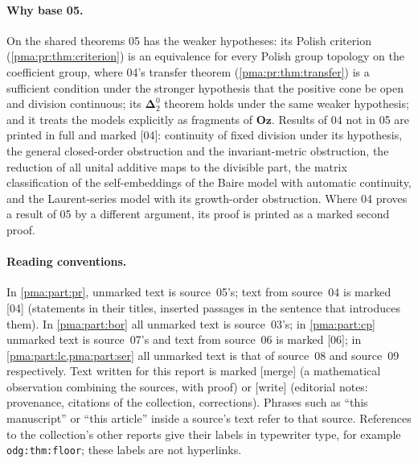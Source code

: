\documentclass[11pt]{article}
\numberwithin{equation}{section}
\theoremstyle{definition}
\theoremstyle{remark}
\newcommand{\Oz}{\mathbf{Oz}}
\newcommand{\Dtwo}{\boldsymbol{\Delta}^{0}_{2}}
\newcommand{\src}[1]{\textup{\textsf{\small[#1]}}}
\newcommand{\mergetag}{\textup{\textsf{\small[merge]}}}
\newcommand{\writetag}{\textup{\textsf{\small[write]}}}
\newcommand{\replabel}[1]{\nolinkurl{#1}}
\begin{document}
\paragraph{Why base 05.} On the shared theorems 05 has the weaker
hypotheses: its Polish criterion (\cref{pma:pr:thm:criterion}) is an
equivalence for every Polish group topology on the coefficient group, where
04's transfer theorem (\cref{pma:pr:thm:transfer}) is a sufficient condition
under the stronger hypothesis that the positive cone be open and division
continuous; its $\Dtwo$ theorem holds under the same weaker hypothesis; and it
treats the models explicitly as fragments of $\Oz$. Results of 04 not in 05
are printed in full and marked \src{04}: continuity of fixed division under
its hypothesis, the general closed-order obstruction and the
invariant-metric obstruction, the reduction of all unital additive maps to the
divisible part, the matrix classification of the self-embeddings of the Baire
model with automatic continuity, and the Laurent-series model with its
growth-order obstruction. Where 04 proves a result of 05 by a different
argument, its proof is printed as a marked second proof.

\paragraph{Reading conventions.} In \cref{pma:part:pr}, unmarked text is
source~05's; text from source~04 is marked \src{04} (statements in their
titles, inserted passages in the sentence that introduces them). In
\cref{pma:part:bor} all unmarked text is source~03's; in \cref{pma:part:cp}
unmarked text is source~07's and text from source~06 is marked \src{06}; in
\cref{pma:part:lc,pma:part:ser} all unmarked text is that of source~08 and
source~09 respectively. Text written for this
report is marked \mergetag{} (a mathematical observation combining the
sources, with proof) or \writetag{} (editorial notes: provenance, citations of
the collection, corrections). Phrases such as ``this manuscript'' or ``this
article'' inside a source's text refer to that source. References to the
collection's other reports give their labels in typewriter type, for example
\replabel{odg:thm:floor}; these labels are not hyperlinks.
\end{document}
